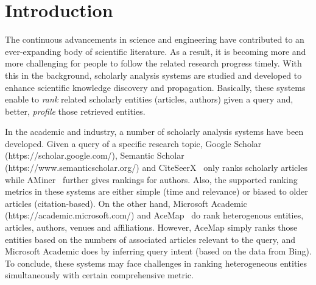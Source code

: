 \section{Introduction}
\label{sec-intro}




The continuous advancements in science and engineering have contributed to an ever-expanding body of scientific literature.
As a result, it is becoming more and more challenging for people to follow the related research progress timely.
With this in the background, scholarly analysis systems are studied and developed to enhance scientific knowledge discovery and propagation. Basically, these systems enable to {\em rank} related scholarly entities (\eg articles, authors) given a query and, better, {\em profile} those retrieved entities.





In the academic and industry, a number of scholarly analysis systems have been developed. Given a query of a specific research topic,  Google Scholar {\scriptsize (https://scholar.google.com/)}, Semantic Scholar {\scriptsize (https://www.semanticscholar.org/)} and CiteSeerX~\cite{li2006citeseerx} only ranks scholarly articles while AMiner~\cite{tang2008arnetminer} further gives rankings for authors. Also, the supported ranking metrics in these systems are either simple (\eg time and relevance) or biased to older articles (\eg citation-based).
%
On the other hand, Microsoft Academic {\scriptsize (https://academic.microsoft.com/)} and AceMap~\cite{tan2016acemap} do rank heterogenous entities, \ie articles, authors, venues and affiliations. However, AceMap simply ranks those entities based on the numbers of associated articles relevant to the query, and Microsoft Academic does by inferring query intent (based on the data from Bing).
%
To conclude, these systems may face challenges in ranking heterogeneous entities simultaneously with certain comprehensive metric.

